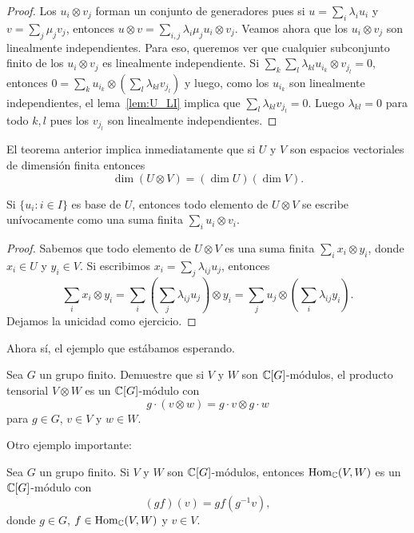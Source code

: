 \begin{proof}
	Los $u_i\otimes v_j$ forman un conjunto de generadores pues  
	si $u=\sum_i\lambda_iu_i$ y $v=\sum_j\mu_jv_j$, entonces
	$u\otimes v=\sum_{i,j}\lambda_i\mu_ju_i\otimes v_j$. 
	Veamos ahora que los $u_i\otimes v_j$ son linealmente independientes. Para
	eso, queremos ver que cualquier subconjunto finito de los $u_i\otimes v_j$
	es linealmente independiente. Si $\sum_k\sum_l\lambda_{kl}u_{i_k}\otimes
	v_{j_l}=0$, entonces
	$0=\sum_{k}u_{i_k}\otimes\left(\sum_{l}\lambda_{kl}v_{j_l}\right)$ y luego,
	como los $u_{i_k}$ son linealmente independientes, el lema~\ref{lem:U_LI}
	implica que $\sum_{l}\lambda_{kl}v_{j_l}=0$. Luego $\lambda_{kl}=0$ para
	todo $k,l$ pues los $v_{j_l}$ son linealmente independientes.
\end{proof}

El teorema anterior implica inmediatamente que si $U$ y $V$ son espacios
vectoriales de dimensión finita entonces
\[
	\dim(U\otimes V)=(\dim U)(\dim V).
\]

\begin{corollary}
	Si $\{u_i:i\in I\}$ es base de $U$, entonces todo elemento de $U\otimes V$
	se escribe unívocamente como una suma finita $\sum_{i}u_i\otimes v_i$.
\end{corollary}

\begin{proof}
	Sabemos que todo elemento de $U\otimes V$ es una suma finita
	$\sum_i x_i\otimes y_i$, donde $x_i\in U$ y $y_i\in V$. Si escribimos 
	$x_i=\sum_j\lambda_{ij}u_j$, entonces
	\[
		\sum_i x_i\otimes y_i=\sum_i\left(\sum_j\lambda_{ij}u_j\right)\otimes y_i		
		=\sum_j u_j\otimes\left(\sum_i\lambda_{ij}y_i\right).
	\]
	Dejamos la unicidad como ejercicio.
\end{proof}

Ahora sí, el ejemplo que estábamos esperando. 

\begin{exercise}
	Sea $G$ un grupo finito. Demuestre que si $V$ y $W$ son $\mathbb{C}[G]$-módulos, el producto
	tensorial $V\otimes W$ es un $\mathbb{C}[G]$-módulo con 
	\[
	g\cdot (v\otimes w)=g\cdot v\otimes
	g\cdot w
	\]
	para $g\in G$, $v\in V$ y $w\in W$.
\end{exercise}

Otro ejemplo importante:

\begin{proposition}
	Sea $G$ un grupo finito. Si $V$ y $W$ son $\mathbb{C}[G]$-módulos, entonces
	$\operatorname{Hom}_{\mathbb{C}}(V,W)$ es un $\mathbb{C}[G]$-módulo con 
	\[
	(gf)(v)=gf(g^{-1}v),
	\]
	donde $g\in G$,
	$f\in\operatorname{Hom}_{\mathbb{C}}(V,W)$ y $v\in V$.
\end{proposition}

